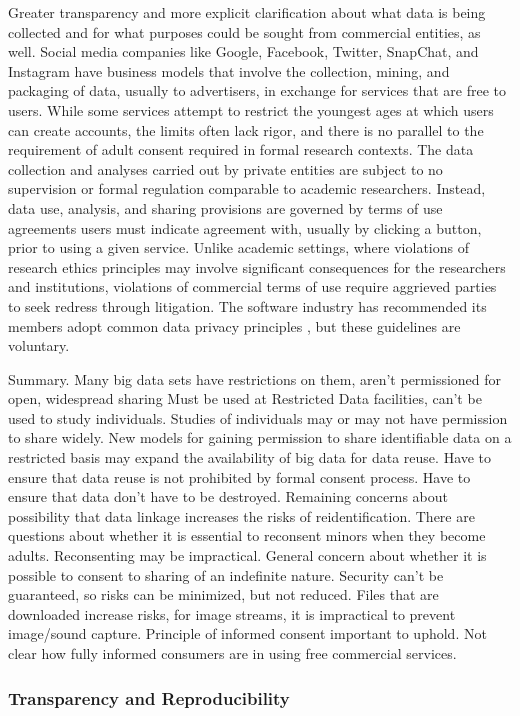 \documentclass[letterpaper,man,apacite]{apa6}
\begin{document}
Greater transparency and more explicit clarification about what data is being collected and for what purposes could be sought from commercial entities, as well.
Social media companies like Google, Facebook, Twitter, SnapChat, and Instagram have business models that involve the collection, mining, and packaging of data, usually to advertisers, in exchange for services that are free to users.
While some services attempt to restrict the youngest ages at which users can create accounts, the limits often lack rigor, and there is no parallel to the requirement of adult consent required in formal research contexts.
The data collection and analyses carried out by private entities are subject to no supervision or formal regulation comparable to academic researchers.
Instead, data use, analysis, and sharing provisions are governed by terms of use agreements users must indicate agreement with, usually by clicking a button, prior to using a given service.
Unlike academic settings, where violations of research ethics principles may involve significant consequences for the researchers and institutions, violations of commercial terms of use require aggrieved parties to seek redress through litigation.
The software industry has recommended its members adopt common data privacy principles \cite{}, but these guidelines are voluntary.

Summary.
Many big data sets have restrictions on them, aren't permissioned for open, widespread sharing
Must be used at Restricted Data facilities, can't be used to study individuals.
Studies of individuals may or may not have permission to share widely.
New models for gaining permission to share identifiable data on a restricted basis may expand the availability of big data for data reuse.
Have to ensure that data reuse is not prohibited by formal consent process.
Have to ensure that data don't have to be destroyed.
Remaining concerns about possibility that data linkage increases the risks of reidentification.
There are questions about whether it is essential to reconsent minors when they become adults.
Reconsenting may be impractical.
General concern about whether it is possible to consent to sharing of an indefinite nature.
Security can't be guaranteed, so risks can be minimized, but not reduced.
Files that are downloaded increase risks, for image streams, it is impractical to prevent image/sound capture.
Principle of informed consent important to uphold.
Not clear how fully informed consumers are in using free commercial services.

\subsubsection{Transparency and Reproducibility}
\end{document}
